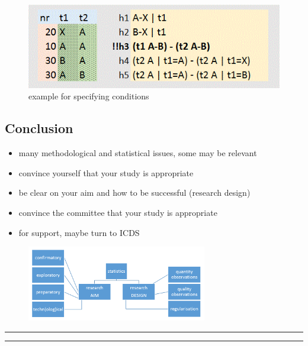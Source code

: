 \documentclass[]{article}
\providecommand{\tightlist}{%
  \setlength{\itemsep}{0pt}\setlength{\parskip}{0pt}}
\begin{document}
\begin{figure}[htbp]
\centering
\includegraphics{conds.png}
\caption{example for specifying conditions}
\end{figure}

\subsection{Conclusion}\label{conclusion}

\begin{itemize}
\tightlist
\item
  many methodological and statistical issues, some may be relevant
\item
  convince yourself that your study is appropriate
\item
  be clear on your aim and how to be successful (research design)
\item
  convince the committee that your study is appropriate
\item
  for support, maybe turn to ICDS
\end{itemize}

\begin{figure}[htbp]
\centering
\includegraphics[width=0.70000\textwidth]{graph.png}
\caption{}
\end{figure}

\begin{center}\rule{0.5\linewidth}{\linethickness}\end{center}

\begin{center}\rule{0.5\linewidth}{\linethickness}\end{center}
\end{document}
